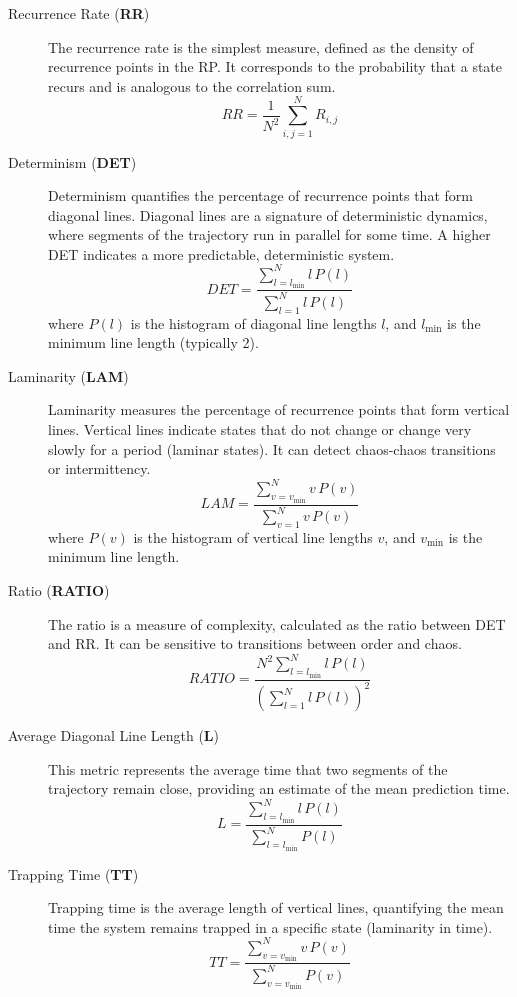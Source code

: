 \documentclass{article}
\begin{document}
					\begin{description}

					\item[Recurrence Rate (\textbf{RR})]
					The recurrence rate is the simplest measure, defined as the density of recurrence points in the RP. It corresponds to the probability that a state recurs and is analogous to the correlation sum.
					\[
					RR = \frac{1}{N^2} \sum_{i,j=1}^{N} R_{i,j}
					\]

					\item[Determinism (\textbf{DET})]
					Determinism quantifies the percentage of recurrence points that form diagonal lines. Diagonal lines are a signature of deterministic dynamics, where segments of the trajectory run in parallel for some time. A higher DET indicates a more predictable, deterministic system.
					\[
					DET = \frac{\sum_{l=l_{\text{min}}}^{N} l \, P(l)}{\sum_{l=1}^{N} l \, P(l)}
					\]
					where \( P(l) \) is the histogram of diagonal line lengths \( l \), and \( l_{\text{min}} \) is the minimum line length (typically 2).

					\item[Laminarity (\textbf{LAM})]
					Laminarity measures the percentage of recurrence points that form vertical lines. Vertical lines indicate states that do not change or change very slowly for a period (laminar states). It can detect chaos-chaos transitions or intermittency.
					\[
					LAM = \frac{\sum_{v=v_{\text{min}}}^{N} v \, P(v)}{\sum_{v=1}^{N} v \, P(v)}
					\]
					where \( P(v) \) is the histogram of vertical line lengths \( v \), and \( v_{\text{min}} \) is the minimum line length.

					\item[Ratio (\textbf{RATIO})]
					The ratio is a measure of complexity, calculated as the ratio between DET and RR. It can be sensitive to transitions between order and chaos.
					\[
					RATIO = \frac{N^2 \sum_{l=l_{\text{min}}}^{N} l \, P(l)}{\left( \sum_{l=1}^{N} l \, P(l) \right)^2}
					\]

					\item[Average Diagonal Line Length (\textbf{L})]
					This metric represents the average time that two segments of the trajectory remain close, providing an estimate of the mean prediction time.
					\[
					L = \frac{\sum_{l=l_{\text{min}}}^{N} l \, P(l)}{\sum_{l=l_{\text{min}}}^{N} P(l)}
					\]

					\item[Trapping Time (\textbf{TT})]
					Trapping time is the average length of vertical lines, quantifying the mean time the system remains trapped in a specific state (laminarity in time).
					\[
					TT = \frac{\sum_{v=v_{\text{min}}}^{N} v \, P(v)}{\sum_{v=v_{\text{min}}}^{N} P(v)}
					\]


\end{description}
\end{document}
